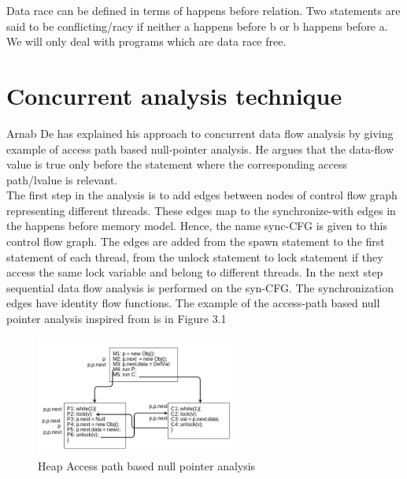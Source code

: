 Data race can be defined in terms of happens before relation. Two statements are said to be conflicting/racy if neither a happens before b or b happens before a. We will only deal with programs which are data race free. 

\section{Concurrent analysis technique}

Arnab De has explained his approach to concurrent data flow analysis\cite{Arnab2006} by giving example of access path based null-pointer analysis. He argues that the data-flow value is true only before the statement where the corresponding access path/lvalue is relevant. \\

The first step in the analysis is to add edges between nodes of control flow graph representing different threads. These edges map to the synchronize-with edges in the happens before memory model. Hence, the name sync-CFG is given to this control flow graph. The edges are added from the spawn statement to the first statement of each thread, from the unlock statement to lock statement if they access the same lock variable and  belong to different threads. In the next step sequential data flow analysis is performed on the syn-CFG. The synchronization edges have identity flow functions. The example of the access-path based null pointer analysis inspired from\cite{Arnab2006} is in Figure 3.1 \\

\begin{figure}
	\centering
	\includegraphics[width=0.6\textwidth]{Figures/concurrent_analysis.png}
	\caption{Heap Access path based null pointer analysis}
	\label{fig:nullpointeranalysis}
\end{figure}


